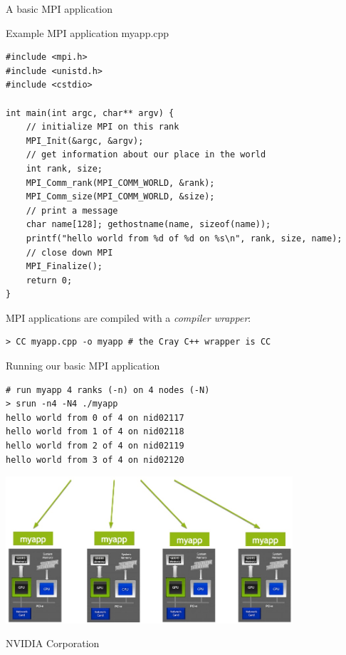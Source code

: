 \documentclass[aspectratio=43]{beamer}
\begin{document}
\begin{frame}[fragile]{A basic MPI application}
    \begin{code}{Example MPI application myapp.cpp}
        \begin{lstlisting}[style=boxcudatiny]
#include <mpi.h>
#include <unistd.h>
#include <cstdio>

int main(int argc, char** argv) {
    // initialize MPI on this rank
    MPI_Init(&argc, &argv);
    // get information about our place in the world
    int rank, size;
    MPI_Comm_rank(MPI_COMM_WORLD, &rank);
    MPI_Comm_size(MPI_COMM_WORLD, &size);
    // print a message
    char name[128]; gethostname(name, sizeof(name));
    printf("hello world from %d of %d on %s\n", rank, size, name);
    // close down MPI
    MPI_Finalize();
    return 0;
}
        \end{lstlisting}
    \end{code}

    MPI applications are compiled with a \emph{compiler wrapper}:
    \begin{terminal}{}
        \begin{lstlisting}[style=terminal]
> CC myapp.cpp -o myapp # the Cray C++ wrapper is CC
        \end{lstlisting}
    \end{terminal}
\end{frame}

\begin{frame}[fragile]{Running our basic MPI application}
    \begin{center}
        \begin{terminal}{}
            \begin{lstlisting}[style=terminal]
# run myapp 4 ranks (-n) on 4 nodes (-N)
> srun -n4 -N4 ./myapp
hello world from 0 of 4 on nid02117
hello world from 1 of 4 on nid02118
hello world from 2 of 4 on nid02119
hello world from 3 of 4 on nid02120
            \end{lstlisting}
        \end{terminal}

        \includegraphics[width=0.8\textwidth]{./images/mpirun.jpg}
    \end{center}
    \footnotesize \quad\quad\quad\textcopyright NVIDIA Corporation
\end{frame}
\end{document}
